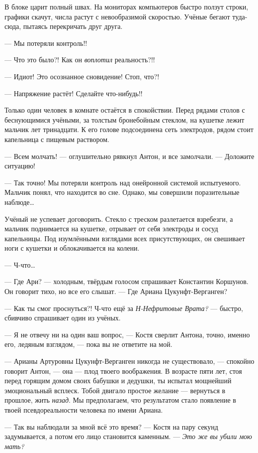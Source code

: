 \documentclass[openany, oneside]{book}
\begin{document}
В блоке царит полный швах. На мониторах компьютеров быстро ползут строки, графики скачут, числа растут с невообразимой скоростью. Учёные бегают туда-сюда, пытаясь перекричать друг друга.

--- Мы потеряли контроль!!

--- Что это было?! Как он \textit{воплотил} реальность?!!

--- Идиот! Это осознанное сновидение! Стоп, что?!

--- Напряжение растёт! Сделайте что-нибудь!!

Только один человек в комнате остаётся в спокойствии. Перед рядами столов с беснующимися учёными, за толстым бронебойным стеклом, на кушетке лежит мальчик лет тринадцати. К его голове подсоединена сеть электродов, рядом стоит капельница с пищевым раствором.

--- Всем молчать! --- оглушительно рявкнул Антон, и все замолчали. --- Доложите ситуацию!

--- Так точно! Мы потеряли контроль над онейронной системой испытуемого. Мальчик понял, что находится во сне. Однако, мы совершили поразительные наблюде\dots

Учёный не успевает договорить. Стекло с треском разлетается взребезги, а мальчик поднимается на кушетке, отрывает от себя электроды и сосуд капельницы. Под изумлёнными взглядами всех присутствующих, он свешивает ноги с кушетки и облокачивается на колени.

--- Ч-что\dots

--- Где Ари? --- холодным, твёрдым голосом спрашивает Константин Коршунов. Он говорит тихо, но все его слышат. --- Где Ариана Цукунфт-Верганген?

--- Как ты смог проснуться?! Ч-что ещё за \textit{Н-Нефритовые Врата?} --- быстро, сбивчиво спрашивает один из учёных.

--- Я не отвечу ни на один ваш вопрос, --- Костя сверлит Антона, точно, именно его, ледяным взглядом, --- пока вы не ответите на мой.

--- Арианы Артуровны Цукунфт-Верганген никогда не существовало, --- спокойно говорит Антон, --- она --- плод твоего воображения. В возрасте пяти лет, стоя перед горящим домом своих бабушки и дедушки, ты испытал мощнейший эмоциональный всплеск. Тобой двигало простое желание --- вернуться в прошлое, жить \textit{назад}. Мы предполагаем, что результатом стало появление в твоей псевдореальности человека по имени Ариана.

--- Так вы наблюдали за мной всё это время? --- Костя на пару секунд задумывается, а потом его лицо становится каменным. --- \textit{Это же вы убили мою мать?}
\end{document}
